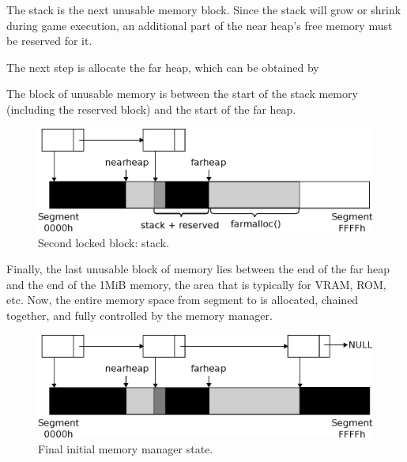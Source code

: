 \documentclass[book.tex]{subfiles}
\begin{document}
\par
The stack is the next unusable memory block. Since the stack will grow or shrink during game execution, an additional part of the near heap's free memory must be reserved for it.\\

\par

\par  

The next step is allocate the far heap, which can be obtained by\\

\par

\par 

The block of unusable memory is between the start of the stack memory (including the reserved block) and the start of the far heap. \\

\begin{figure}[H]
\centering
 \includegraphics[width=\textwidth]{imgs/drawings/mm_stack.eps}
 \caption{Second locked block: stack.}
 \end{figure}
 \par

\par
Finally, the last unusable block of memory lies between the end of the far heap and the end of the 1MiB memory, the area that is typically for VRAM, ROM, etc. Now, the entire memory space from segment  to  is allocated, chained together, and fully controlled by the memory manager.\\

\begin{figure}[H]
\centering
 \includegraphics[width=\textwidth]{imgs/drawings/mm_final.eps}
 \caption{Final initial memory manager state.}
 \end{figure}
\end{document}
